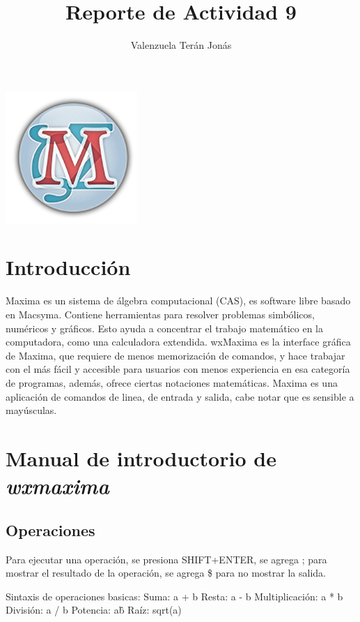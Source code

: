 \documentclass[a4paper]{article}
\title{Reporte de Actividad 9}
\author{Valenzuela Terán Jonás}
\begin{document}
\maketitle


\begin{center}

	\includegraphics[height=5cm]{wxmaxima.png}

\end{center}

\section{Introducción}

Maxima es un sistema de álgebra computacional (CAS), es software libre basado en Macsyma. Contiene herramientas para resolver problemas simbólicos, numéricos y gráficos. Esto ayuda a concentrar el trabajo matemático en la computadora, como una calculadora extendida. wxMaxima es la interface gráfica de Maxima, que requiere de menos memorización de comandos, y hace trabajar con el más fácil y accesible para usuarios con menos experiencia en esa categoría de programas, además, ofrece ciertas notaciones matemáticas. Maxima es una aplicación de comandos de linea, de entrada y salida, cabe notar que es sensible a mayúsculas.


\section{Manual de introductorio de \textit{wxmaxima}}

\subsection{Operaciones}

Para ejecutar una operación, se presiona SHIFT+ENTER, se agrega ; para mostrar el resultado de la operación, se agrega \$ para no mostrar la salida.

Sintaxis de operaciones basicas:
Suma: a + b
Resta: a - b
Multiplicación: a * b
División: a / b
Potencia: a\^b
Raíz: sqrt(a)
\end{document}
